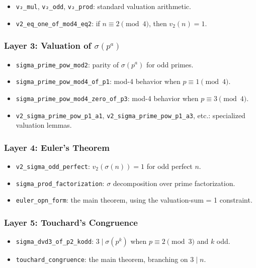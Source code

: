 \documentclass[11pt,a4paper]{article}
\begin{document}
\begin{itemize}
    \item \texttt{v₂\_mul}, \texttt{v₂\_odd}, \texttt{v₂\_prod}: standard valuation arithmetic.
    \item \texttt{v2\_eq\_one\_of\_mod4\_eq2}: if $n \equiv 2 \pmod{4}$, then $v_2(n) = 1$.
\end{itemize}

\subsubsection{Layer 3: Valuation of $\sigma(p^a)$}

\begin{itemize}
    \item \texttt{sigma\_prime\_pow\_mod2}: parity of $\sigma(p^a)$ for odd primes.
    \item \texttt{sigma\_prime\_pow\_mod4\_of\_p1}: mod-4 behavior when $p \equiv 1 \pmod{4}$.
    \item \texttt{sigma\_prime\_pow\_mod4\_zero\_of\_p3}: mod-4 behavior when $p \equiv 3 \pmod{4}$.
    \item \texttt{v2\_sigma\_prime\_pow\_p1\_a1}, \texttt{v2\_sigma\_prime\_pow\_p1\_a3}, etc.: specialized valuation lemmas.
\end{itemize}

\subsubsection{Layer 4: Euler's Theorem}

\begin{itemize}
    \item \texttt{v2\_sigma\_odd\_perfect}: $v_2(\sigma(n)) = 1$ for odd perfect $n$.
    \item \texttt{sigma\_prod\_factorization}: $\sigma$ decomposition over prime factorization.
    \item \texttt{euler\_opn\_form}: the main theorem, using the valuation-sum = 1 constraint.
\end{itemize}

\subsubsection{Layer 5: Touchard's Congruence}

\begin{itemize}
    \item \texttt{sigma\_dvd3\_of\_p2\_kodd}: $3 \mid \sigma(p^k)$ when $p \equiv 2 \pmod{3}$ and $k$ odd.
    \item \texttt{touchard\_congruence}: the main theorem, branching on $3 \mid n$.
\end{itemize}
\end{document}
